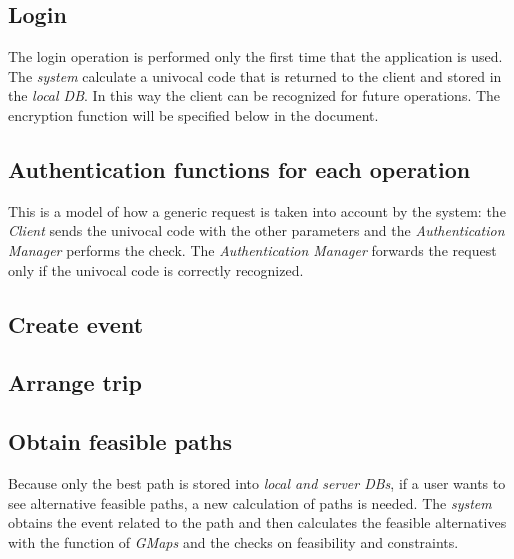 \subsection{Login}
			\noindent{}
			The login operation is performed only the first time that the application is used. 
			The \textit{system} calculate a univocal code that is returned to the client and stored in the \textit{local DB}. In this way the client can be recognized for future operations. 
			The encryption function will be specified below in the document.
\subsection{Authentication functions for each operation}
		\noindent{}
		This is a model of how a generic request is taken into account by the system: the \textit{Client} sends the univocal code with the other parameters and the \textit{Authentication Manager} performs the check. 
		The \textit{Authentication Manager} forwards the request only if the univocal code is correctly recognized.
\subsection{Create event}
		\noindent{}
\subsection{Arrange trip}
		\noindent{}
\subsection{Obtain feasible paths}
		\noindent{}
		Because only the best path is stored into \textit{local and server DBs}, if a user wants to see alternative feasible paths, a new calculation of paths is needed. 
		The \textit{system} obtains the event related to the path and then calculates the feasible alternatives with the function of \textit{GMaps} and the checks on feasibility and constraints.
